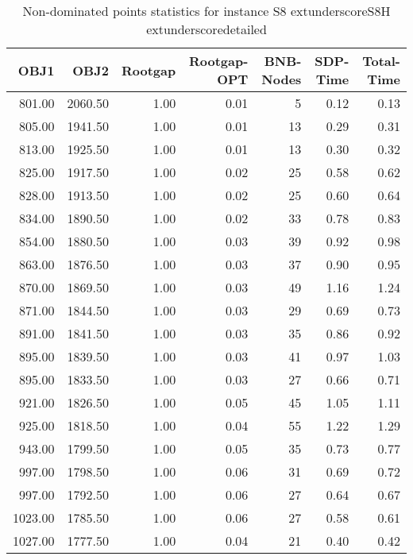 \begin{table}
\caption{Non-dominated points statistics for instance S8	extunderscoreS8H	extunderscoredetailed}
\label{tab:plots/S8_S8H_detailed}
\begin{tabular}{rrrrrrr}
\toprule
OBJ1 & OBJ2 & Rootgap & Rootgap-OPT & BNB-Nodes & SDP-Time & Total-Time \\
\midrule
801.00 & 2060.50 & 1.00 & 0.01 & 5 & 0.12 & 0.13 \\
805.00 & 1941.50 & 1.00 & 0.01 & 13 & 0.29 & 0.31 \\
813.00 & 1925.50 & 1.00 & 0.01 & 13 & 0.30 & 0.32 \\
825.00 & 1917.50 & 1.00 & 0.02 & 25 & 0.58 & 0.62 \\
828.00 & 1913.50 & 1.00 & 0.02 & 25 & 0.60 & 0.64 \\
834.00 & 1890.50 & 1.00 & 0.02 & 33 & 0.78 & 0.83 \\
854.00 & 1880.50 & 1.00 & 0.03 & 39 & 0.92 & 0.98 \\
863.00 & 1876.50 & 1.00 & 0.03 & 37 & 0.90 & 0.95 \\
870.00 & 1869.50 & 1.00 & 0.03 & 49 & 1.16 & 1.24 \\
871.00 & 1844.50 & 1.00 & 0.03 & 29 & 0.69 & 0.73 \\
891.00 & 1841.50 & 1.00 & 0.03 & 35 & 0.86 & 0.92 \\
895.00 & 1839.50 & 1.00 & 0.03 & 41 & 0.97 & 1.03 \\
895.00 & 1833.50 & 1.00 & 0.03 & 27 & 0.66 & 0.71 \\
921.00 & 1826.50 & 1.00 & 0.05 & 45 & 1.05 & 1.11 \\
925.00 & 1818.50 & 1.00 & 0.04 & 55 & 1.22 & 1.29 \\
943.00 & 1799.50 & 1.00 & 0.05 & 35 & 0.73 & 0.77 \\
997.00 & 1798.50 & 1.00 & 0.06 & 31 & 0.69 & 0.72 \\
997.00 & 1792.50 & 1.00 & 0.06 & 27 & 0.64 & 0.67 \\
1023.00 & 1785.50 & 1.00 & 0.06 & 27 & 0.58 & 0.61 \\
1027.00 & 1777.50 & 1.00 & 0.04 & 21 & 0.40 & 0.42 \\
\bottomrule
\end{tabular}
\end{table}
